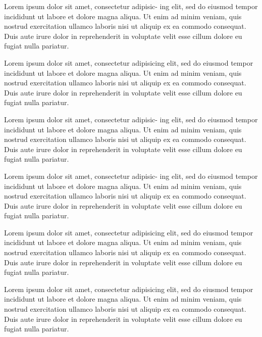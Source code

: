  Lorem ipsum dolor sit amet, consectetur adipisic-
ing elit, sed do eiusmod tempor incididunt ut labore et dolore magna aliqua. Ut enim ad
minim veniam, quis nostrud exercitation ullamco laboris nisi ut aliquip ex ea commodo
consequat. Duis aute irure dolor in reprehenderit in voluptate velit esse cillum dolore eu
fugiat nulla pariatur.


 Lorem ipsum dolor sit amet, consectetur
adipisicing elit, sed do eiusmod tempor incididunt ut labore et dolore magna aliqua.
Ut enim ad minim veniam, quis nostrud exercitation ullamco laboris nisi ut aliquip ex
ea commodo consequat. Duis aute irure dolor in reprehenderit in voluptate velit esse
cillum dolore eu fugiat nulla pariatur.


 Lorem ipsum dolor sit amet, consectetur adipisic-
ing elit, sed do eiusmod tempor incididunt ut labore et dolore magna aliqua. Ut enim ad
minim veniam, quis nostrud exercitation ullamco laboris nisi ut aliquip ex ea commodo
consequat. Duis aute irure dolor in reprehenderit in voluptate velit esse cillum dolore eu
fugiat nulla pariatur.


 Lorem ipsum dolor sit amet, consectetur adipisic-
ing elit, sed do eiusmod tempor incididunt ut labore et dolore magna aliqua. Ut enim ad
minim veniam, quis nostrud exercitation ullamco laboris nisi ut aliquip ex ea commodo
consequat. Duis aute irure dolor in reprehenderit in voluptate velit esse cillum dolore eu
fugiat nulla pariatur.


 Lorem ipsum dolor sit amet, consectetur
adipisicing elit, sed do eiusmod tempor incididunt ut labore et dolore magna aliqua.
Ut enim ad minim veniam, quis nostrud exercitation ullamco laboris nisi ut aliquip ex
ea commodo consequat. Duis aute irure dolor in reprehenderit in voluptate velit esse
cillum dolore eu fugiat nulla pariatur.


 Lorem ipsum dolor sit amet, consectetur
adipisicing elit, sed do eiusmod tempor incididunt ut labore et dolore magna aliqua.
Ut enim ad minim veniam, quis nostrud exercitation ullamco laboris nisi ut aliquip ex
ea commodo consequat. Duis aute irure dolor in reprehenderit in voluptate velit esse
cillum dolore eu fugiat nulla pariatur.
